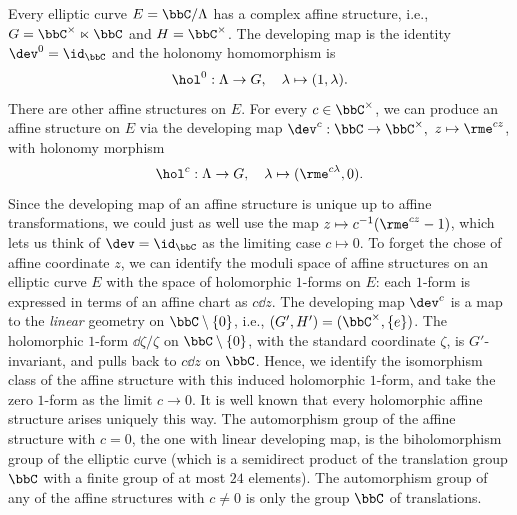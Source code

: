 \begin{example}
    Every elliptic curve $E=\bbC\slash\Lambda$ has a complex affine structure, i.e., $G=\bbC^\times\ltimes\bbC$ and $H=\bbC^\times$. The developing map is the identity $\dev^0=\id_\bbC$ and the holonomy homomorphism is 
    \[\hol^0:\Lambda\to G,\quad \lambda\mapsto (1,\lambda).\]
    There are other affine structures on $E$. For every $c\in \bbC^\times$, we can produce an affine structure on $E$ via the developing map $\dev^c:\bbC\to \bbC^\times,$ $z\mapsto \rme^{cz}$, with holonomy morphism 
    \[\hol^c:\Lambda\to G,\quad \lambda\mapsto (\rme^{c\lambda},0).\]
    Since the developing map of an affine structure is unique up to affine transformations, we could just as well use the map $z\mapsto c^{-1}(\rme^{cz}-1)$, which lets us think of $\dev=\id_\bbC$ as the limiting case $c\mapsto 0$.  To forget the chose of affine coordinate $z$, we can identify the moduli space of affine structures on an elliptic curve $E$ with the space of holomorphic $1$-forms on $E$: each $1$-form is expressed in terms of an affine chart as $c\dd z$. The developing map $\dev^c$ is a map to the \emph{linear} geometry on $\bbC\setminus\{0\}$, i.e., $(G',H')=(\bbC^\times,\{e\})$.  The holomorphic $1$-form $\dd\zeta/\zeta$ on $\bbC\setminus\{0\}$, with the standard coordinate $\zeta$, is $G'$-invariant, and pulls back to $c\dd z$ on $\bbC$. Hence, we identify the isomorphism class of the affine structure with this induced holomorphic $1$-form, and take the zero $1$-form as the limit $c\to 0$.  It is well known that every holomorphic affine structure arises uniquely this way. The automorphism group of the affine structure with $c=0$, the one with linear developing map, is the biholomorphism group of the elliptic curve (which is a semidirect product of the translation group $\bbC$ with a finite group of at most $24$ elements). The automorphism group of any of the affine structures with $c\neq 0$ is only the group $\bbC$ of translations.
\end{example}

